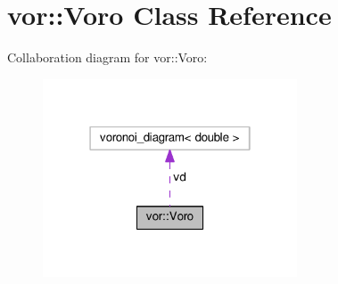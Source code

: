 \hypertarget{classvor_1_1Voro}{}\section{vor\+:\+:Voro Class Reference}
\label{classvor_1_1Voro}


Collaboration diagram for vor\+:\+:Voro\+:
\nopagebreak
\begin{figure}[H]
\begin{center}
\leavevmode
\includegraphics[width=214pt]{classvor_1_1Voro__coll__graph}
\end{center}
\end{figure}
